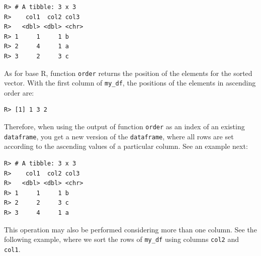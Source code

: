 \documentclass[
  12pt,
]{book}
\newenvironment{Shaded}{\begin{snugshade}}{\end{snugshade}}
\newcommand{\CommentTok}[1]{\textcolor[rgb]{0.37,0.37,0.37}{\textit{#1}}}
\newcommand{\FloatTok}[1]{\textcolor[rgb]{0.06,0.06,0.06}{#1}}
\newcommand{\KeywordTok}[1]{\textcolor[rgb]{0.27,0.27,0.27}{\textbf{#1}}}
\newcommand{\NormalTok}[1]{#1}
\newcommand{\OperatorTok}[1]{\textcolor[rgb]{0.43,0.43,0.43}{\textbf{#1}}}
\newcommand{\StringTok}[1]{\textcolor[rgb]{0.5,0.5,0.5}{#1}}
\begin{document}
\begin{verbatim}
R> # A tibble: 3 x 3
R>    col1  col2 col3 
R>   <dbl> <dbl> <chr>
R> 1     1     1 b    
R> 2     4     1 a    
R> 3     2     3 c
\end{verbatim}

As for base R, function \texttt{order} returns the position of the elements for the sorted vector. With the first column of \texttt{my\_df}, the positions of the elements in ascending order are:

\begin{Shaded}
\end{Shaded}

\begin{verbatim}
R> [1] 1 3 2
\end{verbatim}

Therefore, when using the output of function \texttt{order} as an index of an existing \texttt{dataframe}, you get a new version of the \texttt{dataframe}, where all rows are set according to the ascending values of a particular column. See an example next:

\begin{Shaded}
\end{Shaded}

\begin{verbatim}
R> # A tibble: 3 x 3
R>    col1  col2 col3 
R>   <dbl> <dbl> <chr>
R> 1     1     1 b    
R> 2     2     3 c    
R> 3     4     1 a
\end{verbatim}

This operation may also be performed considering more than one column. See the following example, where we sort the rows of \texttt{my\_df} using columns \texttt{col2} and \texttt{col1}.
\end{document}
